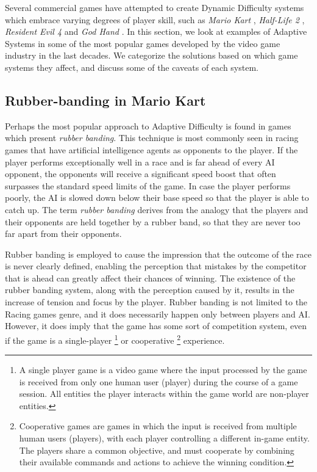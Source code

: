 Several commercial games have attempted to create Dynamic Difficulty systems which embrace varying degrees of player skill, such as \emph{Mario Kart} , \emph{Half-Life 2} , \emph{Resident Evil 4}  and \emph{God Hand} . In this section, we look at examples of Adaptive Systems in some of the most popular games developed by the video game industry in the last decades. We categorize the solutions based on which game systems they affect, and discuss some of the caveats of each system.

\subsection{Rubber-banding in Mario Kart}

Perhaps the most popular approach to Adaptive Difficulty is found in games which present \emph{rubber banding}. This technique is most commonly seen in racing games that have artificial intelligence agents as opponents to the player. If the player performs exceptionally well in a race and is far ahead of every AI opponent, the opponents will receive a significant speed boost that often surpasses the standard speed limits of the game. In case the player performs poorly, the AI is slowed down below their base speed so that the player is able to catch up. The term \emph{rubber banding} derives from the analogy that the players and their opponents are held together by a rubber band, so that they are never too far apart from their opponents.

Rubber banding is employed to cause the impression that the outcome of the race is never clearly defined, enabling the perception that mistakes by the competitor that is ahead can greatly affect their chances of winning. The existence of the rubber banding system, along with the perception caused by it, results in the increase of tension and focus by the player. Rubber banding is not limited to the Racing games genre, and it does necessarily happen only between players and AI. However, it does imply that the game has some sort of competition system, even if the game is a single-player \footnote{A single player game is a video game where the input processed by the game is received from only one human user (player) during the course of a game session. All entities the player interacts within the game world are non-player entities.} or cooperative \footnote{Cooperative games are games in which the input is received from multiple human users (players), with each player controlling a different in-game entity. The players share a common objective, and must cooperate by combining their available commands and actions to achieve the winning condition.} experience.

